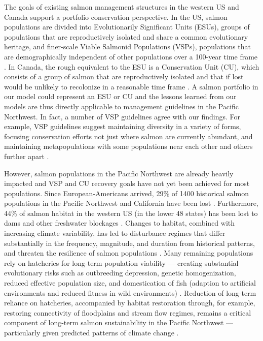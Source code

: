 \documentclass[12pt,english]{article}
\begin{document}
\begin{spacing}{1.9}
The goals of existing salmon management structures in the western US and Canada support a portfolio conservation perspective. In the US, salmon populations are divided into Evolutionarily Significant Units (ESUs), groups of populations that are reproductively isolated and share a common evolutionary heritage, and finer-scale Viable Salmonid Populations (VSPs), populations that are demographically independent of other populations over a 100-year time frame \citep{mcelhany2000}. In Canada, the rough equivalent to the ESU is a Conservation Unit (CU), which consists of a group of salmon that are reproductively isolated and that if lost would be unlikely to recolonize in a reasonable time frame \citep{dfo2005wsp}. A salmon portfolio in our model could represent an ESU or CU and the lessons learned from our models are thus directly applicable to management guidelines in the Pacific Northwest. In fact, a number of VSP guidelines agree with our findings. For example, VSP guidelines suggest maintaining diversity in a variety of forms, focusing conservation efforts not just where salmon are currently abundant, and maintaining metapopulations with some populations near each other and others further apart \citep{mcelhany2000}.

However, salmon populations in the Pacific Northwest are already heavily impacted \citep[e.g.][]{gustafson2007} and VSP and CU recovery goals have not yet been achieved for most populations. Since European-Americans arrived, 29\% of 1400 historical salmon populations in the Pacific Northwest and California have been lost \citep{gustafson2007}. Furthermore, 44\% of salmon habitat in the western US (in the lower 48 states) has been lost to dams and other freshwater blockages \citep{mcclure2008a}. Changes to habitat, combined with increasing climate variability, has led to disturbance regimes that differ substantially in the frequency, magnitude, and duration from historical patterns, and threaten the resilience of salmon populations \citep{waples2009}. Many remaining populations rely on hatcheries for long-term population viability --- creating substantial evolutionary risks such as outbreeding depression, genetic homogenization, reduced effective population size, and domestication of fish (adaption to artificial environments and reduced fitness in wild environments) \citep{mcclure2008b}. Reduction of long-term reliance on hatcheries, accompanied by habitat restoration through, for example, restoring connectivity of floodplains and stream flow regimes, remains a critical component of long-term salmon sustainability in the Pacific Northwest --- particularly given predicted patterns of climate change \citep{beechie2013}.


\end{spacing}
\end{document}
